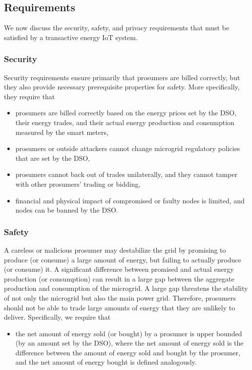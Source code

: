 \subsection{Requirements}
We now discuss the security, safety, and privacy requirements that
must be satisfied by a transactive energy IoT system.

\subsubsection{Security}
Security requirements ensure primarily that prosumers are billed
correctly, but they also provide necessary prerequisite properties for
safety.
More specifically, they require that
\begin{itemize}[noitemsep,topsep=-\parskip]
\item prosumers are billed correctly based on the energy prices set by
  the DSO, their energy trades, and their actual energy production and
  consumption measured by the smart meters,
\item prosumers or outside attackers cannot change microgrid
  regulatory policies that are set by the DSO, 
\item prosumers cannot back out of trades unilaterally, and they
  cannot tamper with other prosumers' trading or bidding,
\item financial and physical impact of compromised or faulty nodes is
  limited, and nodes can be banned by the DSO. 
\end{itemize}

\subsubsection{Safety}
A careless or malicious prosumer may destabilize the grid by promising
to produce (or consume) a large amount of energy, but failing to actually
produce (or consume) it.  A significant difference between promised and
actual energy production (or consumption) can result in a large gap
between the aggregate production and consumption of the microgrid.
A large gap threatens the stability of not only the microgrid but also the main
power grid.  Therefore, prosumers should not be able to trade large
amounts of energy that they are unlikely to deliver.
Specifically, we require that 
\begin{itemize}[noitemsep,topsep=-\parskip]
\item the net amount of energy sold (or bought) by a prosumer is upper
  bounded (by an amount set by the DSO), where the net amount of
  energy sold is the difference between the amount of energy sold and
  bought by the prosumer, and the net amount of energy bought is
  defined analogously. %
\end{itemize}

